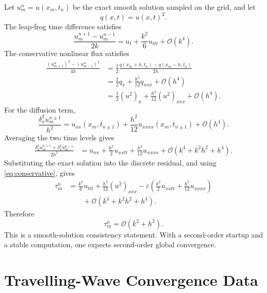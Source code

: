 \documentclass[11pt]{article}
\newcommand{\Oh}{\mathcal{O}}
\begin{document}
Let $u_m^n=u(x_m,t_n)$ be the exact smooth solution sampled on the grid, and let
\begin{equation}
    q(x,t)=u(x,t)^2.
\end{equation}
The leap-frog time difference satisfies
\begin{equation}
    \frac{u_m^{n+1}-u_m^{n-1}}{2k}
    =
    u_t+\frac{k^2}{6}u_{ttt}+\Oh(k^4).
    \label{eq:time-expansion}
\end{equation}
The conservative nonlinear flux satisfies
\begin{align}
    \frac{(u_{m+1}^n)^2-(u_{m-1}^n)^2}{4h}
    &=
    \frac{1}{2}
    \frac{q(x_m+h,t_n)-q(x_m-h,t_n)}{2h}
    \\
    &=
    \frac12 q_x+\frac{h^2}{12}q_{xxx}+\Oh(h^4)
    \\
    &=
    \frac12(u^2)_x+\frac{h^2}{12}(u^2)_{xxx}+\Oh(h^4).
    \label{eq:flux-expansion}
\end{align}
For the diffusion term,
\begin{equation}
    \frac{\delta_x^2u_m^{n\pm1}}{h^2}
    =
    u_{xx}(x_m,t_{n\pm1})
    +
    \frac{h^2}{12}u_{xxxx}(x_m,t_{n\pm1})
    +
    \Oh(h^4).
\end{equation}
Averaging the two time levels gives
\begin{align}
    \frac{\delta_x^2u_m^{n+1}+\delta_x^2u_m^{n-1}}{2h^2}
    &=
    u_{xx}
    +
    \frac{k^2}{2}u_{xxtt}
    +
    \frac{h^2}{12}u_{xxxx}
    +
    \Oh(k^4+k^2h^2+h^4).
    \label{eq:diffusion-expansion}
\end{align}
Substituting the exact solution into the discrete residual, and using
\eqref{eq:conservative}, gives
\begin{equation}
\begin{aligned}
    \tau_m^n
    &=
    \frac{k^2}{6}u_{ttt}
    +
    \frac{h^2}{12}(u^2)_{xxx}
    -
    \varepsilon
    \left(
        \frac{k^2}{2}u_{xxtt}
        +
        \frac{h^2}{12}u_{xxxx}
    \right)
    \\
    &\qquad
    +
    \Oh(k^4+k^2h^2+h^4).
\end{aligned}
\end{equation}
Therefore
\begin{equation}
    \boxed{\tau_m^n=\Oh(k^2+h^2).}
\end{equation}
This is a smooth-solution consistency statement.  With a second-order startup and a
stable computation, one expects second-order global convergence.

\section{Travelling-Wave Convergence Data}
\end{document}
